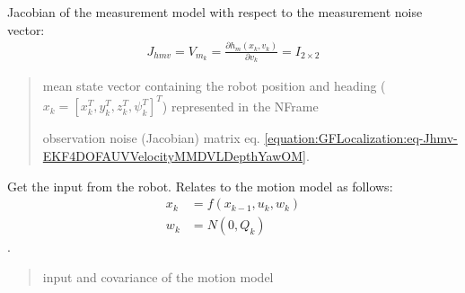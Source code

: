 \documentclass[letterpaper,10pt,english]{sphinxmanual}
\begin{document}
\begin{fulllineitems}
\begin{fulllineitems}
\label{\detokenize{GFLocalization:EKF_4DOFAUV_InputVelocityMM_DVLDepthYawOM.EKF_4DOFAUV_InputVelocityMM_DVLDepthYawOM.Jhmv}}
\pysigstartsignatures
{}
\pysigstopsignatures
\sphinxAtStartPar
Jacobian of the measurement model with respect to the measurement noise vector:
\begin{equation}\label{equation:GFLocalization:eq-Jhmv-EKF4DOFAUVVelocityMMDVLDepthYawOM}
\begin{split}J_{hmv}=V_{m_k}=\frac{\partial h_m(x_k,v_k)}{\partial v_k} = I_{2 \times 2}\end{split}
\end{equation}\begin{quote}\begin{description}
\sphinxAtStartPar
{} \textendash{} mean state vector containing the robot position and heading (\(x_k=[x_k^T, y_k^T, z_k^T, \psi_k^T]^T\)) represented in the N\sphinxhyphen{}Frame

\sphinxAtStartPar
observation noise (Jacobian) matrix eq. \eqref{equation:GFLocalization:eq-Jhmv-EKF4DOFAUVVelocityMMDVLDepthYawOM}.

\end{description}\end{quote}

\end{fulllineitems}


\begin{fulllineitems}
\label{\detokenize{GFLocalization:EKF_4DOFAUV_InputVelocityMM_DVLDepthYawOM.EKF_4DOFAUV_InputVelocityMM_DVLDepthYawOM.GetInput}}
\pysigstartsignatures
{}
\pysigstopsignatures
\sphinxAtStartPar
Get the input from the robot. Relates to the motion model as follows:
\begin{equation}\label{equation:GFLocalization:eq-f-GFLocalization}
\begin{split}x_k &= f(x_{k-1},u_k,w_k) \\
w_k &= N(0,Q_k)\end{split}
\end{equation}
\sphinxAtStartPar
{} .
\begin{quote}\begin{description}
\sphinxAtStartPar
input and covariance of the motion model


\end{description}
\end{quote}
\end{fulllineitems}
\end{fulllineitems}
\end{document}
